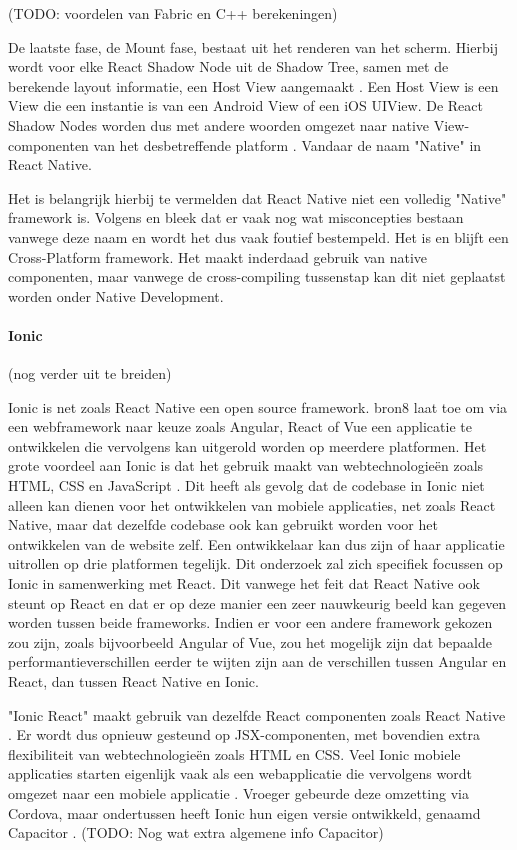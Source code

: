 (TODO: voordelen van Fabric en C++ berekeningen)

De laatste fase, de Mount fase, bestaat uit het renderen van het scherm. Hierbij wordt voor elke React Shadow Node uit de Shadow Tree, samen met de berekende layout informatie, een Host View aangemaakt \autocite{Bron15}. Een Host View is een View die een instantie is van een Android View of een iOS UIView. De React Shadow Nodes worden dus met andere woorden omgezet naar native View-componenten van het desbetreffende platform \autocite{Bron15}. Vandaar de naam "Native" in React Native.

Het is belangrijk hierbij te vermelden dat React Native niet een volledig "Native" framework is. Volgens \autocite{Bron3} en \autocite{Bron2} bleek dat er vaak nog wat misconcepties bestaan vanwege deze naam en wordt het dus vaak foutief bestempeld. Het is en blijft een Cross-Platform framework. Het maakt inderdaad gebruik van native componenten, maar vanwege de cross-compiling tussenstap kan dit niet geplaatst worden onder Native Development.

\paragraph{Ionic}

(nog verder uit te breiden)

Ionic is net zoals React Native een open source framework. {bron8} laat toe om via een webframework naar keuze zoals Angular, React of Vue een applicatie te ontwikkelen die vervolgens kan uitgerold worden op meerdere platformen. Het grote voordeel aan Ionic is dat het gebruik maakt van webtechnologieën zoals HTML, CSS en JavaScript \autocite{Bron8}. Dit heeft als gevolg dat de codebase in Ionic niet alleen kan dienen voor het ontwikkelen van mobiele applicaties, net zoals React Native, maar dat dezelfde codebase ook kan gebruikt worden voor het ontwikkelen van de website zelf. Een ontwikkelaar kan dus zijn of haar applicatie uitrollen op drie platformen tegelijk. Dit onderzoek zal zich specifiek focussen op Ionic in samenwerking met React. Dit vanwege het feit dat React Native ook steunt op React en dat er op deze manier een zeer nauwkeurig beeld kan gegeven worden tussen beide frameworks. Indien er voor een andere framework gekozen zou zijn, zoals bijvoorbeeld Angular of Vue, zou het mogelijk zijn dat bepaalde performantieverschillen eerder te wijten zijn aan de verschillen tussen Angular en React, dan tussen React Native en Ionic.

"Ionic React" maakt gebruik van dezelfde React componenten zoals React Native \autocite{Bron8}. Er wordt dus opnieuw gesteund op JSX-componenten, met bovendien extra flexibiliteit van webtechnologieën zoals HTML en CSS. Veel Ionic mobiele applicaties starten eigenlijk vaak als een webapplicatie die vervolgens wordt omgezet naar een mobiele applicatie \autocite{Bron19}. Vroeger gebeurde deze omzetting via Cordova, maar ondertussen heeft Ionic hun eigen versie ontwikkeld, genaamd Capacitor \autocite{Bron19}. (TODO: Nog wat extra algemene info Capacitor)


